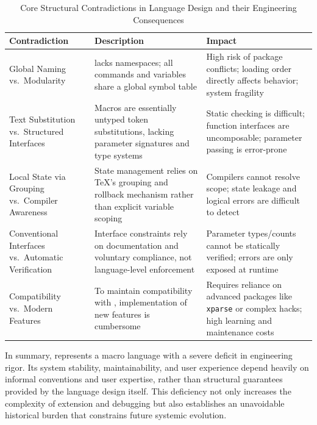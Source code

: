 \begin{table}[t]
    \centering
    \small
    \setlength{\tabcolsep}{6pt}
    \caption{Core Structural Contradictions in \LaTeXe{} Language Design and their Engineering Consequences}
    \label{tab:latex-contradictions}
    \begin{tabular}{p{}p{}p{}}
        \toprule
        \textbf{Contradiction}                              & \textbf{Description}                                                                                      & \textbf{Impact}                                                                                                   \\
        \midrule
        Global Naming vs.\ Modularity                       & \LaTeXe{} lacks namespaces; all commands and variables share a global symbol table                        & High risk of package conflicts; loading order directly affects behavior; system fragility                         \\
        Text Substitution vs.\ Structured Interfaces        & Macros are essentially untyped token substitutions, lacking parameter signatures and type systems         & Static checking is difficult; function interfaces are uncomposable; parameter passing is error-prone              \\
        Local State via Grouping vs.\ Compiler Awareness    & State management relies on \TeX{}'s grouping and rollback mechanism rather than explicit variable scoping & Compilers cannot resolve scope; state leakage and logical errors are difficult to detect                          \\
        Conventional Interfaces vs.\ Automatic Verification & Interface constraints rely on documentation and voluntary compliance, not language-level enforcement      & Parameter types/counts cannot be statically verified; errors are only exposed at runtime                          \\
        Compatibility vs.\ Modern Features                  & To maintain compatibility with \LaTeXe{}, implementation of new features is cumbersome                    & Requires reliance on advanced packages like \texttt{xparse} or complex hacks; high learning and maintenance costs \\
        \bottomrule
    \end{tabular}
\end{table}

In summary, \LaTeXe{} represents a macro language with a severe deficit in engineering rigor. Its system stability, maintainability, and user experience depend heavily on informal conventions and user expertise, rather than structural guarantees provided by the language design itself. This deficiency not only increases the complexity of extension and debugging but also establishes an unavoidable historical burden that constrains future systemic evolution.

